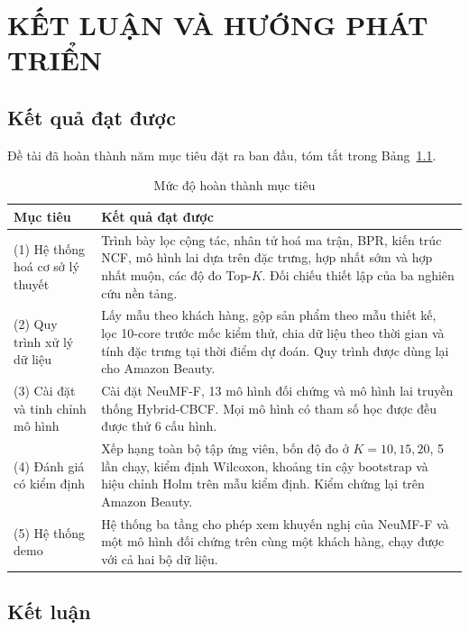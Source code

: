 \chapter{KẾT LUẬN VÀ HƯỚNG PHÁT TRIỂN}
\label{chap:ketluan}

\section{Kết quả đạt được}
\label{sec:ketqua_datduoc}

Đề tài đã hoàn thành năm mục tiêu đặt ra ban đầu, tóm tắt trong Bảng~\ref{tab:muctieu_ketqua}.

\begin{table}[H]
    \centering\small
    \caption{Mức độ hoàn thành mục tiêu}
    \label{tab:muctieu_ketqua}
    \begin{tabularx}{\textwidth}{|>{\raggedright\arraybackslash}p{4.2cm}|>{\raggedright\arraybackslash}X|}
        \hline
        Mục tiêu & Kết quả đạt được \\
        \hline
        (1) Hệ thống hoá cơ sở lý thuyết & Trình bày lọc cộng tác, nhân tử hoá ma trận, BPR, kiến trúc NCF, mô hình lai dựa trên đặc trưng, hợp nhất sớm và hợp nhất muộn, các độ đo Top-$K$. Đối chiếu thiết lập của ba nghiên cứu nền tảng. \\ \hline
        (2) Quy trình xử lý dữ liệu & Lấy mẫu theo khách hàng, gộp sản phẩm theo mẫu thiết kế, lọc 10-core trước mốc kiểm thử, chia dữ liệu theo thời gian và tính đặc trưng tại thời điểm dự đoán. Quy trình được dùng lại cho Amazon Beauty. \\ \hline
        (3) Cài đặt và tinh chỉnh mô hình & Cài đặt NeuMF-F, 13 mô hình đối chứng và mô hình lai truyền thống Hybrid-CBCF. Mọi mô hình có tham số học được đều được thử 6 cấu hình. \\ \hline
        (4) Đánh giá có kiểm định & Xếp hạng toàn bộ tập ứng viên, bốn độ đo ở $K = 10, 15, 20$, 5 lần chạy, kiểm định Wilcoxon, khoảng tin cậy bootstrap và hiệu chỉnh Holm trên mẫu kiểm định. Kiểm chứng lại trên Amazon Beauty. \\ \hline
        (5) Hệ thống demo & Hệ thống ba tầng cho phép xem khuyến nghị của NeuMF-F và một mô hình đối chứng trên cùng một khách hàng, chạy được với cả hai bộ dữ liệu. \\
        \hline
    \end{tabularx}
\end{table}

\section{Kết luận}
\label{sec:ketluan}

